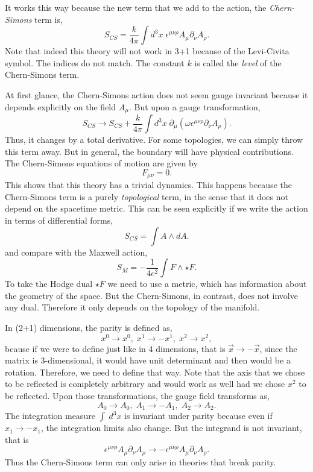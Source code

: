 \documentclass{article}
\begin{document}
It works this way because the new term that we add to the action, the \textit{Chern-Simons} term is, 
\begin{equation}
	S_{CS}=\frac{k}{4\pi}\int d^3x\;\epsilon^{\mu\nu\rho} A_\mu \partial _\nu A_\rho. 
\end{equation}
Note that indeed this theory will not work in 3+1 because of the Levi-Civita symbol. The indices do not match.  The constant $k$ is called the \textit{level} of the Chern-Simons term.

At first glance, the Chern-Simons action does not seem gauge invariant because it depends explicitly on the field $A_\mu$.  But upon a gauge transformation, 
\begin{equation*}
	S_{CS}\to S_{CS}+\frac{k}{4\pi}\int d^3x\; \partial_\mu(\omega\epsilon^{\mu\nu\rho}\partial_\nu A_\rho).
\end{equation*}
Thus, it changes by a total derivative. For some topologies, we can simply throw this term away. But in general, the boundary will have physical contributions. The Chern-Simons equations of motion are given by 
\begin{equation}
	F_{\mu\nu}=0.
\end{equation}
This shows that this theory has a trivial dynamics. This happens because the Chern-Simons term is a purely \textit{topological} term, in the sense that it does not depend on the spacetime metric. This can be seen explicitly if we write the action in terms of differential forms,
\begin{equation}
	S_{CS}=\int A\wedge dA. 
\end{equation}
and compare with the Maxwell action, 
\begin{equation}
	S_M=-\frac{1}{4e^2}\int F\wedge\star F. 
\end{equation}
To take the Hodge dual $\star F$ we need to use a metric, which has information about the geometry of the space. But the Chern-Simons, in contrast, does not involve any dual. Therefore it only depends on the topology of the manifold.

In (2+1) dimensions, the parity is defined as, 
\begin{equation*}
	x^0\to x^0,\;x^1\to -x^1,\; x^2\to x^2,
\end{equation*}
bcause if we were to define just like in 4 dimensions, that is  $\vec{x}\to -\vec{x}$,  since the matrix is 3-dimensional, it would have unit determinant and then would be a rotation. Therefore, we need to define that way. Note that the axis that we chose to be reflected is completely arbitrary and would work as well had we chose $x^2$ to be reflected. Upon those transformations, the gauge field transforms as,
\begin{equation*}
	A_0\to A_0,\;A_1\to-A_1,\;A_2\to A_2.
\end{equation*}
The integration measure $\int\;d^3x$  is invariant under parity because even if $x_1\to -x_1$, the integration limits also change. But the integrand is not invariant, that is 
\begin{equation*}
	\epsilon^{\mu\nu\rho}A_\mu\partial_\nu A_\rho\to-\epsilon^{\mu\nu\rho}A_\mu\partial_\nu A_\rho.
\end{equation*}
Thus the Chern-Simons term can only arise in theories that break parity. 
\end{document}
